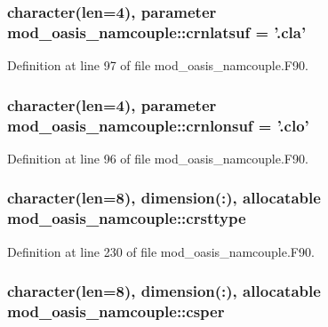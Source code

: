 \hypertarget{classmod__oasis__namcouple_acdc7f0d582616ee9e18470aad433ed3a}{
\subsubsection[{crnlatsuf}]{\setlength{\rightskip}{0pt plus 5cm}character(len=4), parameter mod\+\_\+oasis\+\_\+namcouple\+::crnlatsuf = '.cla'\hspace{0.3cm}{\ttfamily [private]}}}\label{classmod__oasis__namcouple_acdc7f0d582616ee9e18470aad433ed3a}


Definition at line 97 of file mod\+\_\+oasis\+\_\+namcouple.\+F90.

\hypertarget{classmod__oasis__namcouple_ae56f031c6d9a819a39fe5170f42d7ce1}{
\subsubsection[{crnlonsuf}]{\setlength{\rightskip}{0pt plus 5cm}character(len=4), parameter mod\+\_\+oasis\+\_\+namcouple\+::crnlonsuf = '.clo'\hspace{0.3cm}{\ttfamily [private]}}}\label{classmod__oasis__namcouple_ae56f031c6d9a819a39fe5170f42d7ce1}


Definition at line 96 of file mod\+\_\+oasis\+\_\+namcouple.\+F90.

\hypertarget{classmod__oasis__namcouple_a7cbf27327f01748c4f87803ccff71b61}{
\subsubsection[{crsttype}]{\setlength{\rightskip}{0pt plus 5cm}character(len=8), dimension(\+:), allocatable mod\+\_\+oasis\+\_\+namcouple\+::crsttype\hspace{0.3cm}{\ttfamily [private]}}}\label{classmod__oasis__namcouple_a7cbf27327f01748c4f87803ccff71b61}


Definition at line 230 of file mod\+\_\+oasis\+\_\+namcouple.\+F90.

\hypertarget{classmod__oasis__namcouple_a348612422a03e478041ca5bdfd7201ae}{
\subsubsection[{csper}]{\setlength{\rightskip}{0pt plus 5cm}character(len=8), dimension(\+:), allocatable mod\+\_\+oasis\+\_\+namcouple\+::csper\hspace{0.3cm}{\ttfamily [private]}}}\label{classmod__oasis__namcouple_a348612422a03e478041ca5bdfd7201ae}


